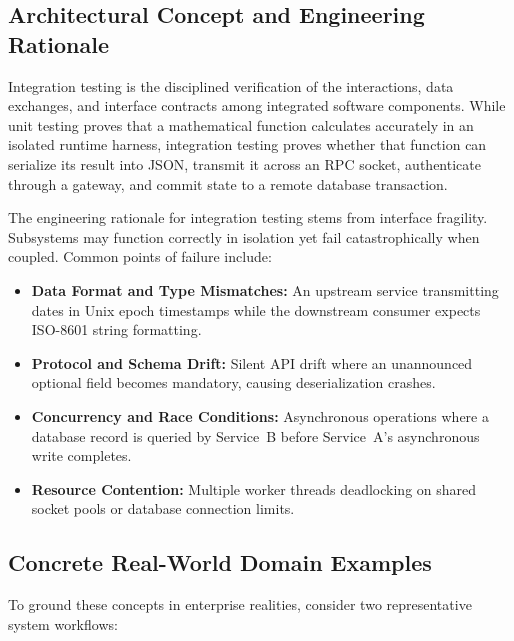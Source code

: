 \documentclass[11pt,a4paper]{article}
\begin{document}
\subsection{Architectural Concept and Engineering Rationale}
Integration testing is the disciplined verification of the interactions, data exchanges, and interface contracts among integrated software components. While unit testing proves that a mathematical function calculates accurately in an isolated runtime harness, integration testing proves whether that function can serialize its result into JSON, transmit it across an RPC socket, authenticate through a gateway, and commit state to a remote database transaction.

The engineering rationale for integration testing stems from interface fragility. Subsystems may function correctly in isolation yet fail catastrophically when coupled. Common points of failure include:
\begin{itemize}
    \item \textbf{Data Format and Type Mismatches:} An upstream service transmitting dates in Unix epoch timestamps while the downstream consumer expects ISO-8601 string formatting.
    \item \textbf{Protocol and Schema Drift:} Silent API drift where an unannounced optional field becomes mandatory, causing deserialization crashes.
    \item \textbf{Concurrency and Race Conditions:} Asynchronous operations where a database record is queried by Service~B before Service~A's asynchronous write completes.
    \item \textbf{Resource Contention:} Multiple worker threads deadlocking on shared socket pools or database connection limits.
\end{itemize}

\subsection{Concrete Real-World Domain Examples}
To ground these concepts in enterprise realities, consider two representative system workflows:
\end{document}
